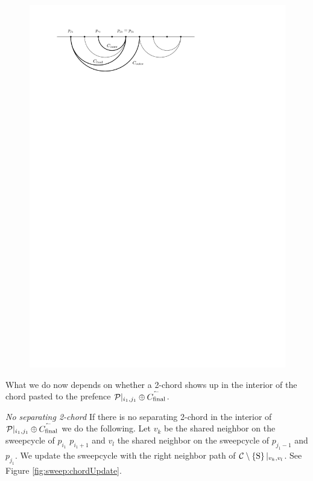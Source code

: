     \begin{figure}[h]
      \centering
      \includegraphics[scale=1]{unifiedalgo/img/sweep/chordsOnPrefence}
      \caption{}
      \label{fig:sweep:chordsOnPrefence}
    \end{figure}

    What we do now depends on whether a 2-chord shows up in the interior of the chord pasted to the prefence $\mathcal{P}|_{i_1, j_1} \oplus \accentset{\leftharpoonup}{{C_\text{final}}}$.

    \emph{No separating 2-chord}
    If there is no separating 2-chord in the interior of $\mathcal{P}|_{i_1, j_1} \oplus \accentset{\leftharpoonup}{{C_\text{final}}}$ we do the following. Let $v_k$ be the shared neighbor on the sweepcycle of $p_{i_1}$ $p_{i_1 +1}$ and $v_l$ the shared neighbor on the sweepcycle  of $p_{j_1 -1}$ and $p_{j_1}$. We update the sweepcycle with the right neighbor path of $\mathcal{C} \setminus \left\lbrace {\mathrm{S}} \right\rbrace|_{v_k, v_l}$. See Figure \ref{fig:sweep:chordUpdate}.

